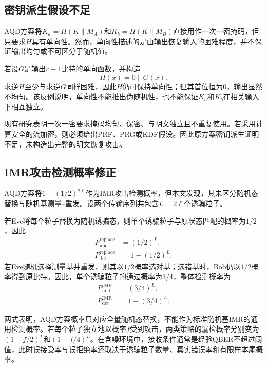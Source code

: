 \documentclass[UTF8,10pt,a4paper]{ctexart}
\theoremstyle{aqdplain}
\newcommand{\concat}{\mathbin{\|}}
\begin{document}
\subsection{密钥派生假设不足}

AQD方案将$K_a=H(K\concat M_A)$和$K_b=H(K\concat M_B)$直接用作一次一密掩码，但只要求$H$具有单向性\citep{zhang2025aqd}。然而，单向性描述的是由输出恢复输入的困难程度，并不保证输出均匀或不可区分于随机值。

若设$G$是输出$r-1$比特的单向函数，并构造
\begin{equation}
H(x)=0\concat G(x).
\end{equation}
求逆$H$至少与求逆$G$同样困难，因此$H$仍可保持单向性；但其首位恒为0，输出显然不均匀。该反例说明，单向性不能推出伪随机性，也不能保证$K_a$和$K_b$在相关输入下相互独立。

现有研究表明一次一密要求掩码均匀、保密、与明文独立且不重复使用\citep{shannon1949}。若采用计算安全的流加密，则必须给出PRF、PRG或KDF假设。因此原方案密钥派生证明不足，未构造出完整的明文恢复攻击。

\subsection{IMR攻击检测概率修正}
\label{sec:imr-correction}

AQD方案将$1-(1/2)^{2\ell}$作为IMR攻击检测概率\citep{zhang2025aqd}，但本文发现，其未区分随机态替换与随机基测量--重发。设两个传输序列共包含$L=2\ell$个诱骗粒子。

若Eve将每个粒子替换为随机诱骗态，则单个诱骗粒子与原状态匹配的概率为$1/2$，因此
\begin{equation}
\begin{aligned}
P_{\mathrm{und}}^{\mathrm{replace}}&=(1/2)^L,\\
P_{\mathrm{det}}^{\mathrm{replace}}&=1-(1/2)^L.
\end{aligned}
\label{eq:replace}
\end{equation}
若Eve随机选择测量基并重发，则其以$1/2$概率选对基；选错基时，Bob仍以$1/2$概率得到原比特。因此，单个诱骗粒子的通过概率为$3/4$，整体检测概率为
\begin{equation}
\begin{aligned}
P_{\mathrm{und}}^{\mathrm{IMR}}&=(3/4)^L,\\
P_{\mathrm{det}}^{\mathrm{IMR}}&=1-(3/4)^L.
\end{aligned}
\label{eq:imr}
\end{equation}

两式表明，AQD方案概率只对应全量随机态替换，不能作为标准随机基IMR的通用检测概率。若每个粒子独立地以概率$f$受到攻击，两类策略的漏检概率分别变为$(1-f/2)^L$和$(1-f/4)^L$。在含噪环境中，接收条件通常是经验QBER不超过阈值，此时误接受率与误拒绝率还取决于诱骗粒子数量、真实错误率和有限样本尾概率。
\end{document}
